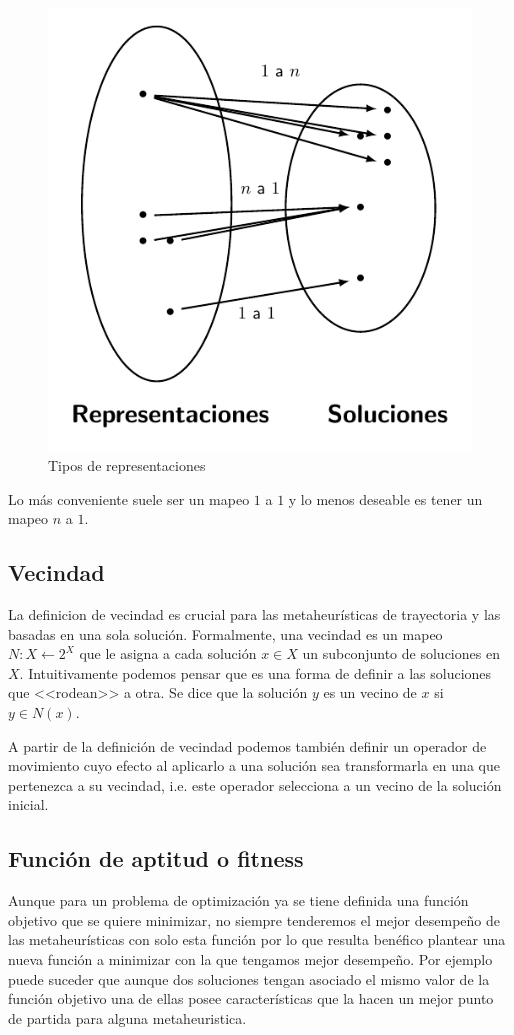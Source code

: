 \begin{figure}[H]
    \centering
    \includegraphics[scale=1]{Imagenes/representacion.pdf}
    \caption{Tipos de representaciones}
\end{figure}
Lo más conveniente suele ser un mapeo $1$ a $1$ y lo menos deseable es tener un mapeo $n$ a $1$.

\subsection{Vecindad}
La definicion de vecindad es crucial para las metaheurísticas de trayectoria y las basadas en una sola solución.
Formalmente, una vecindad es un mapeo $N:X\leftarrow 2^X$ que le asigna a cada solución $x\in X$ un subconjunto de soluciones en $X$. Intuitivamente podemos pensar que es una forma de definir a las soluciones que <<rodean>> a otra. Se dice que la solución $y$ es un vecino de $x$ si $y\in N(x)$.

A partir de la definición de vecindad podemos también definir un operador de movimiento cuyo efecto al aplicarlo a una solución sea transformarla en una que pertenezca a su vecindad, i.e. este operador selecciona a un vecino de la solución inicial.  
 
\subsection{Función de aptitud o fitness}
Aunque para un problema de optimización ya se tiene definida una función objetivo que se quiere minimizar, no siempre tenderemos el mejor desempeño de las metaheurísticas con solo esta función por lo que resulta benéfico plantear una nueva función a minimizar con la que tengamos mejor desempeño. Por ejemplo puede suceder que aunque dos soluciones tengan asociado el mismo valor de la función objetivo una de ellas posee características que la hacen un mejor punto de partida para alguna metaheuristica.

